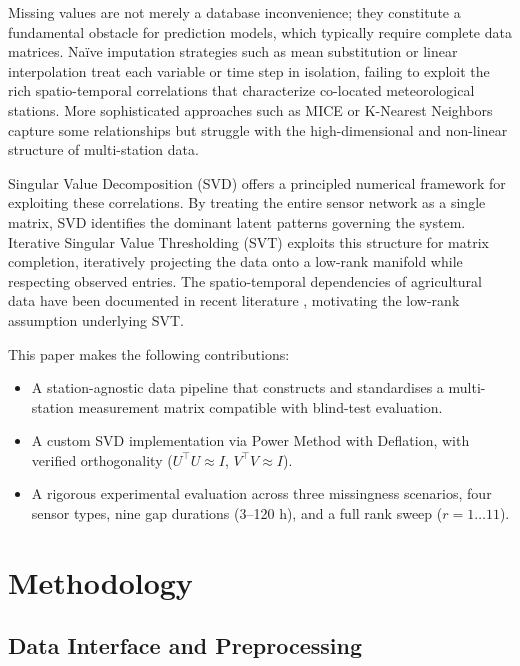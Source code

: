 \documentclass[conference]{IEEEtran}
\begin{document}
Missing values are not merely a database inconvenience; they constitute a fundamental obstacle for prediction models, which typically require complete data matrices. Naïve imputation strategies such as mean substitution or linear interpolation treat each variable or time step in isolation, failing to exploit the rich spatio-temporal correlations that characterize co-located meteorological stations. More sophisticated approaches such as MICE or K-Nearest Neighbors capture some relationships but struggle with the high-dimensional and non-linear structure of multi-station data.

Singular Value Decomposition (SVD) offers a principled numerical framework for exploiting these correlations. By treating the entire sensor network as a single matrix, SVD identifies the dominant latent patterns governing the system. Iterative Singular Value Thresholding (SVT) \cite{cai2010svt} exploits this structure for matrix completion, iteratively projecting the data onto a low-rank manifold while respecting observed entries. The spatio-temporal dependencies of agricultural data have been documented in recent literature \cite{sentop2023spatio}, motivating the low-rank assumption underlying SVT.

This paper makes the following contributions:
\begin{itemize}
    \item A station-agnostic data pipeline that constructs and standardises a multi-station measurement matrix compatible with blind-test evaluation.
    \item A custom SVD implementation via Power Method with Deflation, with verified orthogonality ($U^\top U \approx I$, $V^\top V \approx I$).
    \item A rigorous experimental evaluation across three missingness scenarios, four sensor types, nine gap durations (3–120 h), and a full rank sweep ($r = 1 \ldots 11$).
\end{itemize}

\section{Methodology}
\label{sec:method}

\subsection{Data Interface and Preprocessing}
\end{document}
